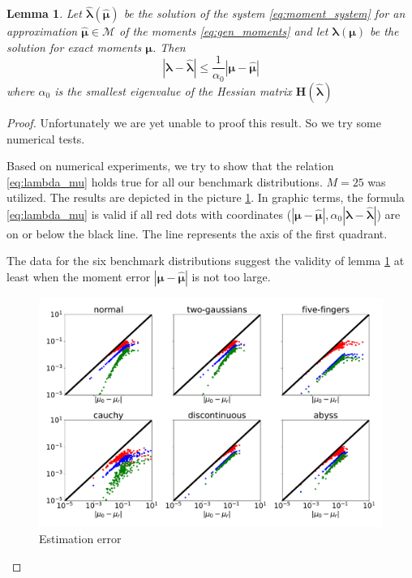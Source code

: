 \documentclass{article}
\newtheorem{lemma}[theorem]{Lemma}
\def\vc#1{\mathbf{\boldsymbol{#1}}}     %
\def\tn#1{\boldsymbol{#1}}
\def\abs#1{|#1|}
\def\vl{{\vc\lambda}}
\def\estvl{{\vc{\hat\lambda}}}
\def\vmu{\vc\mu}
\def\estvmu{{\vc{\hat\mu}}}
\begin{document}
\begin{lemma}
\label{thm:lambda_est}
Let $\estvl(\estvmu)$ be the solution of the system \eqref{eq:moment_system} for an approximation 
$\estvmu \in \mathcal M$ of the moments \eqref{eq:gen_moments} and let $\vl(\vmu)$ be the solution 
for exact moments $\vmu$. Then
\begin{equation}
\label{eq:lambda_mu}
   \abs{\vl - \estvl} \le \frac{1}{\alpha_0} \abs{\vmu - \estvmu} 
\end{equation}
where $\alpha_0$ is the smallest eigenvalue of the Hessian matrix $\tn H(\estvl)$
\end{lemma}
\begin{proof}
Unfortunately we are yet unable to proof this result. So we try some numerical tests.

Based on numerical experiments, we try to show that the relation \ref{eq:lambda_mu} holds true for all our benchmark distributions. $M=25$ was utilized.
 The results are depicted in the picture \ref{fig:lambda_kl_tv}. In graphic terms, the formula \ref{eq:lambda_mu} is valid if all red dots with coordinates ($|\vmu - \estvmu|, \alpha_{0}|\vl - \estvl|$) are on or below the black line. The line represents the axis of the first quadrant. 


The data for the six benchmark distributions suggest the validity of lemma \ref{thm:lambda_est} at least when the moment error $|\vmu - \estvmu|$ is not too large.
\begin{figure}[!htb]
\begin{center} 
\includegraphics[width=\textwidth]{lambda_kl_tv.pdf}
\end{center} 
\caption{Estimation error}
\label{fig:lambda_kl_tv}
\end{figure} 


\end{proof}
\end{document}
